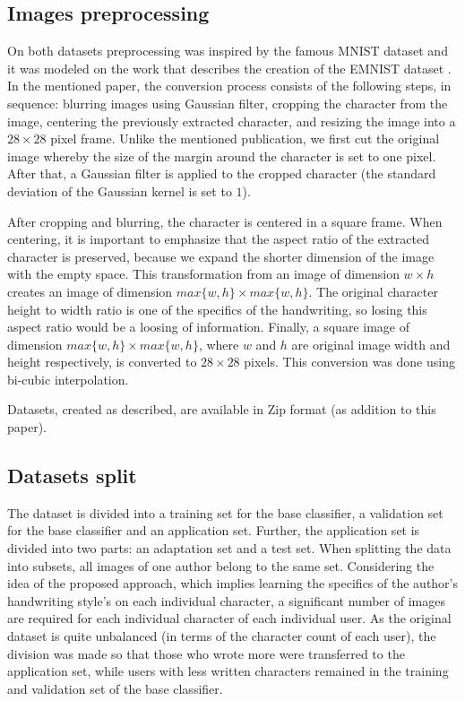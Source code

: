 \documentclass{article}
\begin{document}
\subsection{Images preprocessing}

On both datasets preprocessing was inspired by the famous MNIST dataset \citep{mnist} and it was modeled on the work that describes the creation of the EMNIST dataset \citep{emnist}.
In the mentioned paper, the conversion process consists of the following steps, in sequence:
blurring images using Gaussian filter, cropping the character from the image, centering the previously extracted character, and resizing the image into a $28 \times 28$ pixel frame.
Unlike the mentioned publication, we first cut the original image whereby the size of the margin around the character is set to one pixel.
After that, a Gaussian filter is applied to the cropped character (the standard deviation of the Gaussian kernel is set to $1$).

After cropping and blurring, the character is centered in a square frame.
When centering, it is important to emphasize that the aspect ratio of the extracted character is preserved, because we expand the shorter dimension of the image with the empty space.
This transformation from an image of dimension $w\times h$ creates an image of dimension $max\{w, h\}\times max\{w, h\}$.
The original character height to width ratio is one of the specifics of the handwriting, so losing this aspect ratio would be a loosing of information.
Finally, a square image of dimension $max\{w, h\}\times max\{w, h\}$,
where $w$ and $h$ are original image width and height respectively, is converted to $28 \times 28$ pixels.
This conversion was done using bi-cubic interpolation.

Datasets, created as described, are available in Zip format (as addition to this paper).

\subsection{Datasets split}

The dataset is divided into a training set for the base classifier, a validation set for the base classifier and an application set.
Further, the application set is divided into two parts: an adaptation set and a test set.
When splitting the data into subsets, all images of one author belong to the same set.
Considering the idea of the proposed approach, which implies learning the specifics of the author's handwriting style's on each individual character,
a significant number of images are required for each individual character of each individual user.
As the original dataset is quite unbalanced (in terms of the character count of each user), the division was made so that those who wrote more were transferred to the application set,
while users with less written characters remained in the training and validation set of the base classifier.
\end{document}
